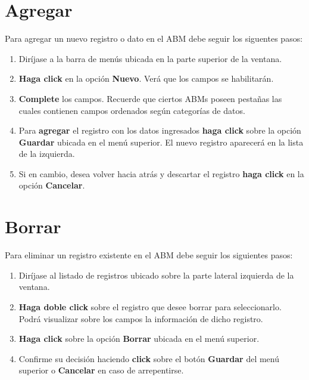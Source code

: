 \documentclass{book}
\begin{document}
\section{Agregar}

Para agregar un nuevo registro o dato en el ABM debe seguir los siguentes pasos:
\medskip

\begin{enumerate}
	\itemsep=8pt \topsep=0pt \partopsep=0pt \parskip=0pt \parsep=0pt
	
	\item Diríjase a la barra de menús ubicada en la parte superior de la ventana.

	\item \textbf{Haga click} en la opción \textbf{Nuevo}. Verá que los campos se habilitarán.

	\item \textbf{Complete} los campos. Recuerde que ciertos ABMs poseen pestañas las cuales contienen campos ordenados según categorías de datos.

	\item Para \textbf{agregar} el registro con los datos ingresados \textbf{haga click} sobre la opción \textbf{Guardar} ubicada en el menú superior. El nuevo registro aparecerá en la lista de la izquierda.

	\item Si en cambio, desea volver hacia atrás y descartar el registro \textbf{haga click} en la opción \textbf{Cancelar}.

\end{enumerate}
\medskip



\section{Borrar}

Para eliminar un registro existente en el ABM debe seguir los siguientes pasos:
\medskip

\begin{enumerate}
	\itemsep=8pt \topsep=0pt \partopsep=0pt \parskip=0pt \parsep=0pt
	
	\item Diríjase al listado de registros ubicado sobre la parte lateral izquierda de la ventana.

	\item \textbf{Haga doble click} sobre el registro que desee borrar para seleccionarlo. Podrá visualizar sobre los campos la información de dicho registro.

	\item \textbf{Haga click} sobre la opción \textbf{Borrar} ubicada en el menú superior.

	\item Confirme su decisión haciendo \textbf{click} sobre el botón \textbf{Guardar} del menú superior o \textbf{Cancelar} en caso de arrepentirse.

\end{enumerate}
\medskip
\end{document}
